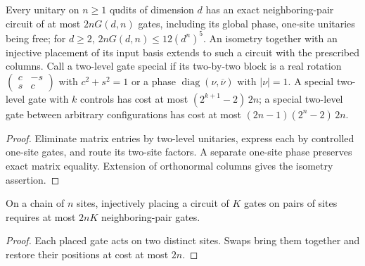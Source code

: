 \begin{lemma}
    \label{thm:mpu_quantitative_unitary_synthesis}
    \leanok
    Every unitary on $n\geq1$ qudits of dimension $d$
    has an exact neighboring-pair circuit of at most
    $2nG(d,n)$ gates, including its global phase, one-site unitaries
    being free; for $d\geq2$, $2nG(d,n)\leq12(d^n)^5$.
    An isometry together with an injective placement of its input
    basis extends to such a circuit with the prescribed columns.
    Call a two-level gate special if its two-by-two block is a real
    rotation $\begin{pmatrix}c&-s\\s&c\end{pmatrix}$ with $c^2+s^2=1$
    or a phase $\operatorname{diag}(\nu,\overline\nu)$ with $|\nu|=1$.
    A special two-level gate with $k$ controls has cost at most
    $(2^{k+1}-2)\,2n$; a special two-level gate between arbitrary configurations
    has cost at most $(2n-1)(2^n-2)\,2n$.
\end{lemma}
\begin{proof}\leanok
    Eliminate matrix entries by two-level unitaries, express each
    by controlled one-site gates, and route its two-site factors.
    A separate one-site phase preserves exact matrix equality.
    Extension of orthonormal columns gives the isometry assertion.
\end{proof}

\begin{lemma}
    \label{thm:mpu_arbitrary_circuit_placement}
    \leanok
    On a chain of $n$ sites,
    injectively placing a circuit of $K$ gates on pairs of sites
    requires at most $2nK$ neighboring-pair gates.
\end{lemma}
\begin{proof}\leanok
    Each placed gate acts on two distinct sites. Swaps bring them
    together and restore their positions at cost at most $2n$.
\end{proof}

